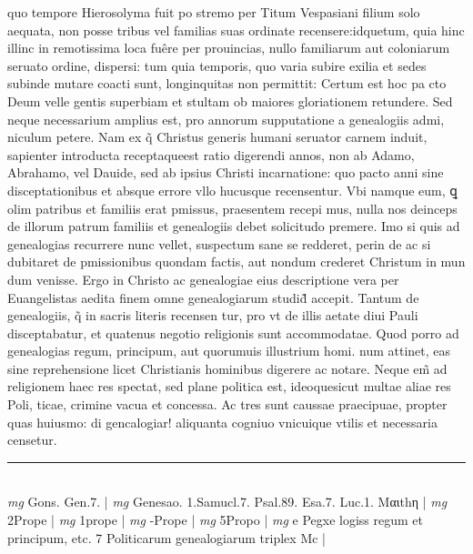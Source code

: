 \documentclass{article}
\begin{document}
\begin{pages}
quo tempore Hierosolyma fuit po stremo per Titum Vespasiani filium solo aequata, non posse tribus vel familias suas ordinate recensere:idquetum, quia hinc illinc in remotissima loca fuêre per prouincias, nullo familiarum aut coloniarum seruato ordine, dispersi: tum quia temporis, quo varia subire exilia et sedes subinde mutare coacti sunt, longinquitas non permittit: Certum est hoc pa cto Deum velle gentis superbiam et stultam ob maiores gloriationem retundere.  \pend\pstart Sed neque  necessarium amplius est, pro annorum supputatione a genealogiis admi, niculum petere. Nam ex q̃ Christus generis humani seruator carnem induit, sapienter introducta receptaqueest ratio digerendi annos, non ab Adamo, Abrahamo, vel Dauide, sed ab ipsius Christi incarnatione: quo pacto anni sine disceptationibus  et absque  errore vllo hucusque  recensentur. Vbi namque  eum, ꝗ olim patribus  et familiis erat pmissus, praesentem recepi mus, nulla nos deinceps de illorum patrum familiis et genealogiis debet solicitudo premere. Imo si quis ad genealogias recurrere nunc vellet, suspectum sane se redderet, perin de ac si dubitaret de pmissionibus quondam factis, aut nondum crederet Christum in mun dum venisse. Ergo in Christo ac genealogiae eius descriptione vera per Euangelistas aedita finem omne genealogiarum studid̃ accepit. Tantum de genealogiis, q̃ in sacris literis recensen tur, pro vt de illis aetate diui Pauli disceptabatur, et quatenus negotio religionis sunt accommodatae. Quod porro ad genealogias regum, principum, aut quorumuis illustrium homi. num attinet, eas sine reprehensione licet Christianis hominibus digerere ac notare. Neque  em̃ ad religionem haec res spectat, sed plane politica est, ideoquesicut multae aliae res Poli, ticae, crimine vacua et concessa. Ac tres sunt caussae praecipuae, propter quas huiusmo: di gencalogiar! aliquanta cogniuo vnicuique  vtilis et necessaria censetur.  \pend
\vspace{0.5cm}\noindent
\vspace{0.2cm}\rule{1cm}{0.2pt}\\ 
\hspace{0.2cm}\textit{mg}
\footnotesize Gons. Gen.7. 
\normalsize| 
\hspace{0.2cm}\textit{mg}
\footnotesize Genesao. 1.Samucl.7. Psal.89. Esa.7. Luc.1. Mαιthη 
\normalsize| 
\hspace{0.2cm}\textit{mg}
\footnotesize 2Prope
\normalsize| 
\hspace{0.2cm}\textit{mg}
\footnotesize 1prope 
\normalsize| 
\hspace{0.2cm}\textit{mg}
\footnotesize -Prope 
\normalsize| 
\hspace{0.2cm}\textit{mg}
\footnotesize 5Propo 
\normalsize| 
\hspace{0.2cm}\textit{mg}
\footnotesize e Pegxe logiss regum et principum, etc. 7 Politicarum genealogiarum triplex Mc 
\normalsize| 

\end{pages}
\end{document}
